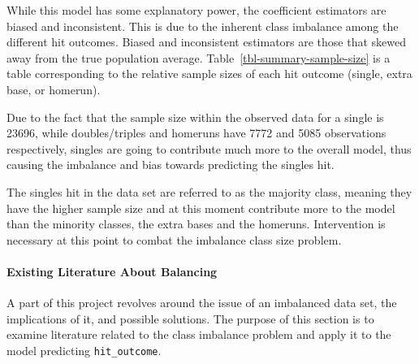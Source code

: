 \documentclass[
  letterpaper,
  DIV=11,
  numbers=noendperiod]{scrartcl}
\let\oldparagraph\paragraph
\renewcommand{\paragraph}[1]{\oldparagraph{#1}\mbox{}}
\begin{document}
While this model has some explanatory power, the coefficient estimators
are biased and inconsistent. This is due to the inherent class imbalance
among the different hit outcomes. Biased and inconsistent estimators are
those that skewed away from the true population average.
Table~\ref{tbl-summary-sample-size} is a table corresponding to the
relative sample sizes of each hit outcome (single, extra base, or
homerun).

\begin{table}

\caption{\label{tbl-summary-sample-size}Summary of Sample Sizes for Each
Class}


\end{table}%

Due to the fact that the sample size within the observed data for a
single is 23696, while doubles/triples and homeruns have 7772 and 5085
observations respectively, singles are going to contribute much more to
the overall model, thus causing the imbalance and bias towards
predicting the singles hit.

The singles hit in the data set are referred to as the majority class,
meaning they have the higher sample size and at this moment contribute
more to the model than the minority classes, the extra bases and the
homeruns. Intervention is necessary at this point to combat the
imbalance class size problem.

\paragraph{Existing Literature About
Balancing}\label{existing-literature-about-balancing}

A part of this project revolves around the issue of an imbalanced data
set, the implications of it, and possible solutions. The purpose of this
section is to examine literature related to the class imbalance problem
and apply it to the model predicting \texttt{hit\_outcome}.
\end{document}
